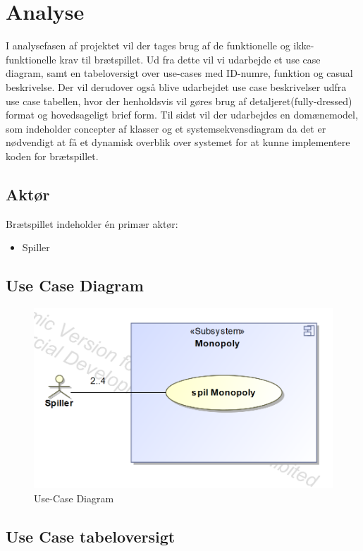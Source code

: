 \documentclass[../main.tex]{subfiles}
\begin{document}
\section{Analyse}

\begin{flushleft} 
I analysefasen af projektet vil der tages  brug af de  funktionelle og ikke-funktionelle krav til brætspillet. Ud fra dette vil vi udarbejde et use case diagram, samt en tabeloversigt over use-cases med ID-numre, funktion og casual beskrivelse. 
Der vil derudover også blive udarbejdet use case beskrivelser udfra use case tabellen, hvor der henholdsvis vil gøres brug af detaljeret(fully-dressed) format og hovedsageligt brief form.
 Til sidst vil der udarbejdes en domænemodel, som indeholder concepter af klasser og et systemsekvensdiagram da det er nødvendigt at få et dynamisk overblik over systemet for at kunne implementere koden for brætspillet.
\end{flushleft}


\subsection{Aktør}
Brætspillet indeholder én primær aktør:
\begin{itemize}
  \item  Spiller
\end{itemize}


\subsection{Use Case Diagram}
\begin{figure}[H]
    \centering
    \includegraphics[width=0.6\linewidth]{figures/use-case_Diagram.png}
    \caption{Use-Case Diagram}
    \label{fig:UCDia}
\end{figure}

\newpage 

\subsection{Use Case tabeloversigt}
\end{document}
